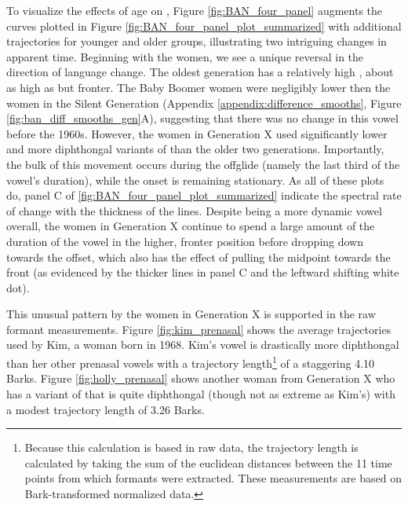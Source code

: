To visualize the effects of age on \ban, Figure \ref{fig:BAN_four_panel} augments the curves plotted in Figure \ref{fig:BAN_four_panel_plot_summarized} with additional trajectories for younger and older groups, illustrating two intriguing changes in apparent time. Beginning with the women, we see a unique reversal in the direction of language change. The oldest generation has a relatively high \ban, about as high as \bet but fronter. The Baby Boomer women were negligibly lower then the women in the Silent Generation (Appendix \ref{appendix:difference_smooths}, Figure \ref{fig:ban_diff_smooths_gen}A), suggesting that there was no change in this vowel before the 1960s. However, the women in Generation X used significantly lower and more diphthongal variants of \ban than the older two generations. Importantly, the bulk of this movement occurs during the offglide (namely the last third of the vowel's duration), while the onset is remaining stationary. As all of these plots do, panel C of \ref{fig:BAN_four_panel_plot_summarized} indicate the spectral rate of change with the thickness of the lines. Despite being a more dynamic vowel overall, the women in Generation X continue to spend a large amount of the duration of the vowel in the higher, fronter position before dropping down towards the offset, which also has the effect of pulling the midpoint towards the front (as evidenced by the thicker lines in panel C and the leftward shifting white dot).

This unusual pattern by the women in Generation X is supported in the raw formant measurements. Figure \ref{fig:kim_prenasal} shows the average trajectories used by Kim, a woman born in 1968. Kim's \ban vowel is drastically more diphthongal than her other prenasal vowels with a trajectory length\footnote{Because this calculation is based in raw data, the trajectory length is calculated by taking the sum of the euclidean distances between the 11 time points from which formants were extracted. These measurements are based on Bark-transformed normalized data.} of a staggering 4.10 Barks. Figure \ref{fig:holly_prenasal} shows another woman from Generation X who has a variant of \ban that is quite diphthongal (though not as extreme as Kim's) with a modest trajectory length of 3.26 Barks.


